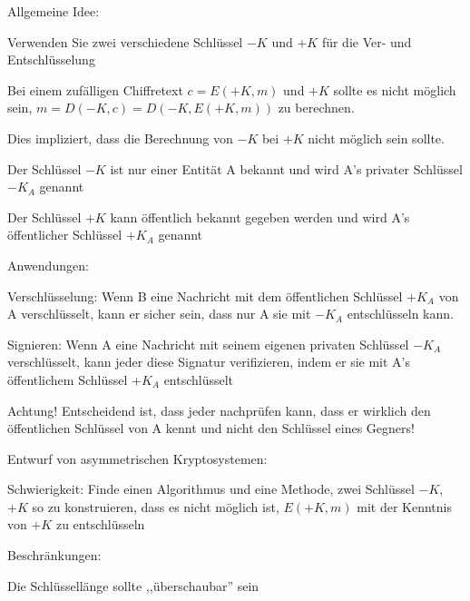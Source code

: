 \documentclass[a4paper]{article}
\begin{document}
\begin{multicols}{3}
      \begin{itemize*}
            \item Allgemeine Idee:
            \begin{itemize*}
                  \item Verwenden Sie zwei verschiedene Schlüssel $-K$ und $+K$ für die Ver- und Entschlüsselung
                  \item Bei einem zufälligen Chiffretext $c=E(+K, m)$ und $+K$ sollte es nicht möglich sein, $m = D(-K, c) = D(-K, E(+K, m))$ zu berechnen.
                  \item Dies impliziert, dass die Berechnung von $-K$ bei $+K$ nicht möglich sein sollte.
                  \item Der Schlüssel $-K$ ist nur einer Entität A bekannt und wird A's privater Schlüssel $-K_A$ genannt
                  \item Der Schlüssel $+K$ kann öffentlich bekannt gegeben werden und wird A's öffentlicher Schlüssel $+K_A$ genannt
            \end{itemize*}
            \item Anwendungen:
            \begin{itemize*}
                  \item Verschlüsselung: Wenn B eine Nachricht mit dem öffentlichen Schlüssel $+K_A$ von A verschlüsselt, kann er sicher sein, dass nur A sie mit $-K_A$ entschlüsseln kann.
                  \item Signieren: Wenn A eine Nachricht mit seinem eigenen privaten Schlüssel $-K_A$ verschlüsselt, kann jeder diese Signatur verifizieren, indem er sie mit A's öffentlichem Schlüssel $+K_A$ entschlüsselt
                  \item Achtung! Entscheidend ist, dass jeder nachprüfen kann, dass er wirklich den öffentlichen Schlüssel von A kennt und nicht den Schlüssel eines Gegners!
            \end{itemize*}
            \item Entwurf von asymmetrischen Kryptosystemen:
            \begin{itemize*}
                  \item Schwierigkeit: Finde einen Algorithmus und eine Methode, zwei Schlüssel $-K$, $+K$ so zu konstruieren, dass es nicht möglich ist, $E(+K, m)$ mit der Kenntnis von $+K$ zu entschlüsseln
                  \item Beschränkungen:
                  \begin{itemize*}
                        \item Die Schlüssellänge sollte ,,überschaubar'' sein

\end{itemize*}
\end{itemize*}
\end{itemize*}
\end{multicols}
\end{document}
